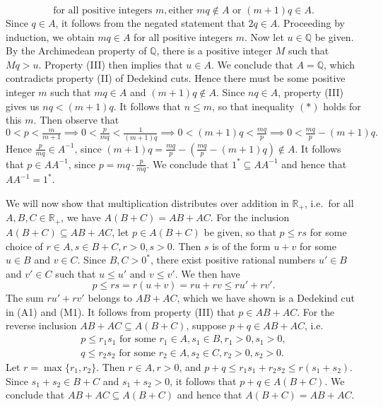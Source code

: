\documentclass[12pt]{article}
\theoremstyle{definition}
\begin{document}
\begin{enumerate}[label = (M\arabic*)]
    \[
        \text{for all positive integers } m, \text{either }  mq \not\in A \text{ or } (m+1)q \in A.
    \]
    Since \( q \in A \), it follows from the negated statement that \( 2q \in A \). Proceeding by induction, we obtain \( mq \in A \) for all positive integers \( m \). Now let \( u \in \mathbb{Q} \) be given. By the Archimedean property of \( \mathbb{Q} \), there is a positive integer \( M \) such that \( Mq > u \). Property (III) then implies that \( u \in A \). We conclude that \( A = \mathbb{Q} \), which contradicts property (II) of Dedekind cuts. Hence there must be some positive integer \( m \) such that \( mq \in A \) and \( (m+1)q \not\in A \). Since \( nq \in A \), property (III) gives us \( nq < (m+1)q \). It follows that \( n \leq m \), so that inequality \( (*) \) holds for this \( m \). Then observe that
    \[
        0 < p < \tfrac{m}{m+1} \implies 0 < \tfrac{p}{mq} < \tfrac{1}{(m+1)q} \implies 0 < (m+1)q < \tfrac{mq}{p} \implies 0 < \tfrac{mq}{p} - (m+1)q.
    \]
    Hence \( \tfrac{p}{mq} \in A^{-1} \), since \( (m+1)q = \tfrac{mq}{p} - (\tfrac{mq}{p} - (m+1)q) \not\in A \). It follows that \( p \in AA^{-1} \), since \( p = mq \cdot \tfrac{p}{mq} \). We conclude that \( 1^* \subseteq AA^{-1} \) and hence that \( AA^{-1} = 1^* \).    
\end{enumerate}

We will now show that multiplication distributes over addition in \( \mathbb{R}_+ \), i.e.\ for all \( A, B, C \in \mathbb{R}_+ \), we have \( A(B + C) = AB + AC \). For the inclusion \( A(B + C) \subseteq AB + AC \), let \( p \in A(B + C) \) be given, so that \( p \leq rs \) for some choice of \( r \in A, s \in B + C, r > 0, s > 0 \). Then \( s \) is of the form \( u + v \) for some \( u \in B \) and \( v \in C \). Since \( B, C > 0^* \), there exist positive rational numbers \( u' \in B \) and \( v' \in C \) such that \( u \leq u' \) and \( v \leq v' \). We then have
\[
    p \leq rs = r(u + v) = ru + rv \leq ru' + rv'.
\]
The sum \( ru' + rv' \) belongs to \( AB + AC \), which we have shown is a Dedekind cut in (A1) and (M1). It follows from property (III) that \( p \in AB + AC \). For the reverse inclusion \( AB + AC \subseteq A(B + C) \), suppose \( p + q \in AB + AC \), i.e.\
\begin{gather*}
    p \leq r_1 s_1 \text { for some } r_1 \in A, s_1 \in B, r_1 > 0, s_1 > 0, \\
    q \leq r_2 s_2 \text { for some } r_2 \in A, s_2 \in C, r_2 > 0, s_2 > 0.
\end{gather*}
Let \( r = \max\{ r_1, r_2 \} \). Then \( r \in A, r > 0 \), and \( p + q \leq r_1 s_1 + r_2 s_2 \leq r(s_1 + s_2) \). Since \( s_1 + s_2 \in B + C \) and \( s_1 + s_2 > 0 \), it follows that \( p + q \in A(B + C) \). We conclude that \( AB + AC \subseteq A(B + C) \) and hence that \( A(B + C) = AB + AC \).
\end{document}
